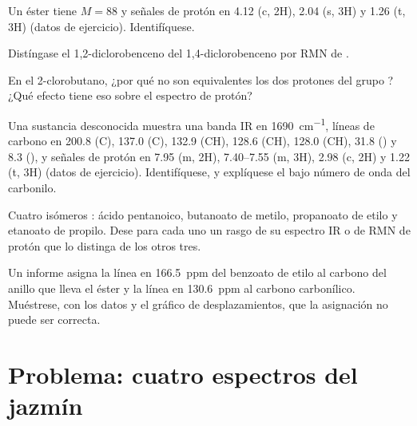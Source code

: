 \begin{exercise}[$\star\star$]\label{exo:b2:structure-determination:7}
Un éster tiene $M = 88$ y señales de protón en 4.12 (c, 2H), 2.04 (s, 3H) y 1.26 (t, 3H) (datos de
ejercicio). Identifíquese.
\end{exercise}

\begin{exercise}[$\star\star$]\label{exo:b2:structure-determination:8}
Distíngase el 1,2-diclorobenceno del 1,4-diclorobenceno por RMN de .
\end{exercise}

\begin{exercise}[$\star\star$]\label{exo:b2:structure-determination:9}
En el 2-clorobutano, ¿por qué no son equivalentes los dos protones del grupo ? ¿Qué efecto tiene eso sobre
el espectro de protón?
\end{exercise}

\begin{exercise}[$\star\star\star$]\label{exo:b2:structure-determination:10}
Una sustancia desconocida  muestra una banda IR en \qty{1690}{cm^{-1}}, líneas de carbono en 200.8 (C), 137.0 (C),
132.9 (CH), 128.6 (CH), 128.0 (CH), 31.8 () y 8.3 (), y señales de protón en 7.95 (m,
2H), 7.40--7.55 (m, 3H), 2.98 (c, 2H) y 1.22 (t, 3H) (datos de ejercicio). Identifíquese, y explíquese el
bajo número de onda del carbonilo.
\end{exercise}

\begin{exercise}[$\star\star\star$]\label{exo:b2:structure-determination:11}
Cuatro isómeros : ácido pentanoico, butanoato de metilo, propanoato de etilo y etanoato de propilo.
Dese para cada uno un rasgo de su espectro IR o de RMN de protón que lo distinga de los otros tres.
\end{exercise}

\begin{exercise}[$\star\star\star$]\label{exo:b2:structure-determination:12}
Un informe asigna la línea en 166.5~ppm del benzoato de etilo al carbono del anillo que lleva el éster y
la línea en 130.6~ppm al carbono carbonílico. Muéstrese, con los datos  y el gráfico de desplazamientos, que la
asignación no puede ser correcta.
\end{exercise}

\section{Problema: cuatro espectros del jazmín}

